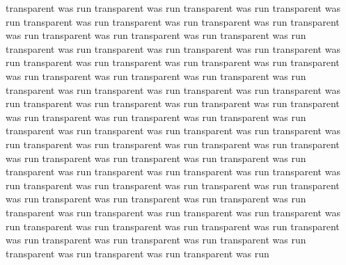 transparent was run
transparent was run
transparent was run
transparent was run
transparent was run
transparent was run
transparent was run
transparent was run
transparent was run
transparent was run
transparent was run
transparent was run
transparent was run
transparent was run
transparent was run
transparent was run
transparent was run
transparent was run
transparent was run
transparent was run
transparent was run
transparent was run
transparent was run
transparent was run
transparent was run
transparent was run
transparent was run
transparent was run
transparent was run
transparent was run
transparent was run
transparent was run
transparent was run
transparent was run
transparent was run
transparent was run
transparent was run
transparent was run
transparent was run
transparent was run
transparent was run
transparent was run
transparent was run
transparent was run
transparent was run
transparent was run
transparent was run
transparent was run
transparent was run
transparent was run
transparent was run
transparent was run
transparent was run
transparent was run
transparent was run
transparent was run
transparent was run
transparent was run
transparent was run
transparent was run
transparent was run
transparent was run
transparent was run
transparent was run
transparent was run
transparent was run
transparent was run
transparent was run
transparent was run
